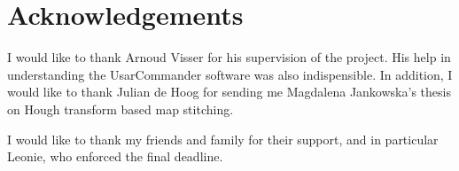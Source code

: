 \chapter*{Acknowledgements}

I would like to thank Arnoud Visser for his supervision of the project. His help in understanding the UsarCommander software was also indispensible.  In addition, I would like to thank Julian de Hoog for sending me Magdalena Jankowska's thesis on Hough transform based map stitching.

I would like to thank my friends and family for their support, and in particular Leonie, who enforced the final deadline.